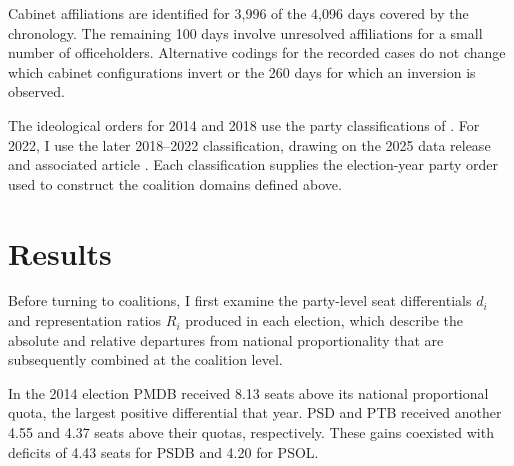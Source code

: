 \documentclass[11pt]{article}
\begin{document}
Cabinet affiliations are identified for 3,996 of the 4,096 days covered by the
chronology. The remaining 100 days involve unresolved affiliations for a small
number of officeholders. Alternative codings for the recorded cases do not
change which cabinet configurations invert or the 260 days for which an
inversion is observed.

The ideological orders for 2014 and 2018 use the party classifications
of \textcite{bolognesi2023nova}. For 2022, I use the later 2018--2022
classification, drawing on the 2025 data release and associated article
\parencite{bolognesi2026desaparecimento}.
Each classification supplies the election-year party order used to construct
the coalition domains defined above.


\section{Results}
\label{sec:party}

Before turning to coalitions, I first examine the party-level seat differentials
\(d_i\) and representation ratios \(R_i\) produced in each election, which
describe the absolute and relative departures from national proportionality
that are subsequently combined at the coalition level.


In the 2014 election PMDB received 8.13 seats above its national proportional
quota, the largest positive differential that year. PSD and PTB received another
4.55 and 4.37 seats above their quotas, respectively. These gains coexisted with
deficits of 4.43 seats for PSDB and 4.20 for PSOL.
\end{document}
